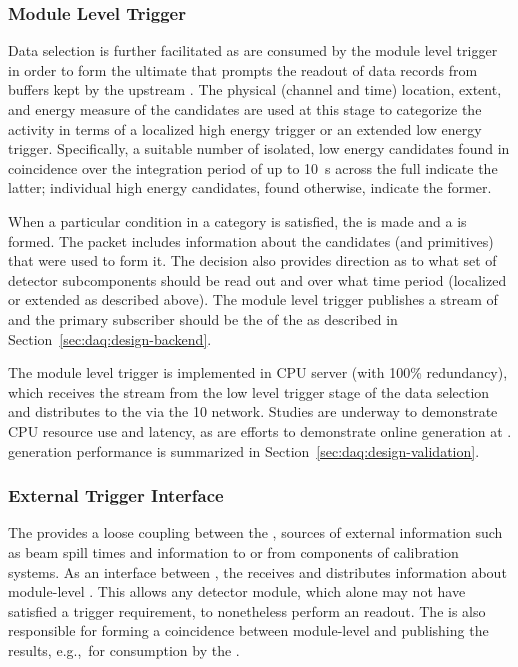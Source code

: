 \subsubsection{Module Level Trigger}
\label{sec:daq:mlt}

Data selection is further facilitated as  are consumed
by the module level trigger in order to form the ultimate  that prompts the readout of data records from buffers kept by the upstream . 
The physical (channel and time) location, extent, and energy measure of the
candidates are used at this stage to categorize the activity in terms
of a localized high energy trigger or an extended low energy trigger. 
Specifically, a suitable number of isolated, low energy candidates found in coincidence
over the integration period of up to \SI{10}{\second} across the full 
indicate the latter; individual high energy candidates, found
otherwise, indicate the former.

When a particular condition in a category is satisfied, the  is made and a  is formed. 
The  packet includes information about the candidates (and primitives)
that were used to form it. 
The decision also provides direction as to what set of detector subcomponents
should be read out and over what time period (localized or extended as described above). 
The module level trigger publishes a stream of  and the primary subscriber should be the  of the  as described in Section~\ref{sec:daq:design-backend}.

The module level trigger is implemented in  CPU server (with 100\%
redundancy), which
receives the  stream from the low level trigger stage
of the data selection and distributes  to the
 via the \SI{10}{\Gbps}  network. Studies are
underway to demonstrate CPU resource use and latency, as are
efforts to demonstrate online  generation at .
 generation performance is summarized in
Section~\ref{sec:daq:design-validation}.

\subsubsection{External Trigger Interface}

The  provides a loose coupling between the
, sources of external information such as beam spill times
and information to or from components of  
calibration systems. As an interface between , the  receives and distributes information about module-level  .
This allows any detector module, which alone may not have satisfied a  trigger requirement, to nonetheless perform an  readout.
The  is also responsible for forming a coincidence between module-level   and publishing the results, e.g.,~for consumption by the .

